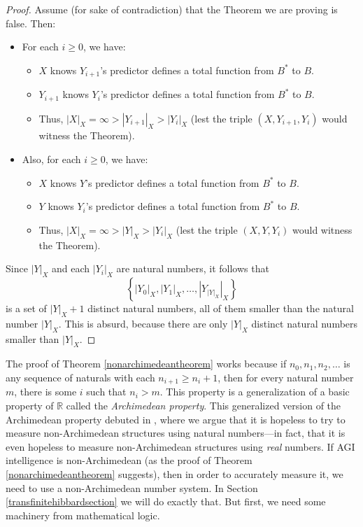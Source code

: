 \documentclass{article}
\begin{document}
\begin{proof}
    Assume (for sake of contradiction) that the Theorem we are proving is false.
    Then:
    \begin{itemize}
        \item
        For each $i\geq 0$, we have:
        \begin{itemize}
            \item
            $X$ knows $Y_{i+1}$'s predictor defines a total function from $B^*$ to $B$.
            \item
            $Y_{i+1}$ knows $Y_i$'s predictor defines a total function from $B^*$ to $B$.
            \item
            Thus, $|X|_X=\infty>|Y_{i+1}|_X>|Y_i|_X$ (lest the triple $(X,Y_{i+1},Y_i)$
            would witness the Theorem).
        \end{itemize}
        \item
        Also, for each $i\geq 0$, we have:
        \begin{itemize}
            \item
            $X$ knows $Y$'s predictor defines a total function from $B^*$ to $B$.
            \item
            $Y$ knows $Y_i$'s predictor defines a total function from $B^*$ to $B$.
            \item
            Thus, $|X|_X=\infty>|Y|_X>|Y_i|_X$ (lest the triple $(X,Y,Y_i)$
            would witness the Theorem).
        \end{itemize}
    \end{itemize}
    Since $|Y|_X$ and each $|Y_i|_X$ are natural numbers, it follows that
    \[
        \left\{|Y_0|_X,|Y_1|_X,\ldots,\left|Y_{|Y|_X}\right|_X\right\}
    \]
    is a set of $|Y|_X+1$ distinct natural numbers,
    all of them smaller than the natural number $|Y|_X$.
    This is absurd, because there are only $|Y|_X$ distinct natural numbers
    smaller than $|Y|_X$.
\end{proof}

The proof of Theorem \ref{nonarchimedeantheorem} works because if $n_0,n_1,n_2,\ldots$
is any sequence of naturals with each $n_{i+1}\geq n_i+1$, then for every natural number
$m$, there is some $i$ such that $n_i>m$. This property is a generalization of a
basic property of $\mathbb R$ called the \emph{Archimedean property}. This generalized
version of the Archimedean property debuted in \cite{alexander2020archimedean},
where we argue that it is hopeless to try to measure non-Archimedean structures
using natural numbers---in fact, that it is even hopeless to measure non-Archimedean
structures using \emph{real} numbers. If AGI intelligence is non-Archimedean (as the
proof of Theorem \ref{nonarchimedeantheorem} suggests), then in order to
accurately measure it, we need to use a non-Archimedean number system.
In Section \ref{transfinitehibbardsection}
we will do exactly that. But first, we need some machinery from mathematical logic.
\end{document}
